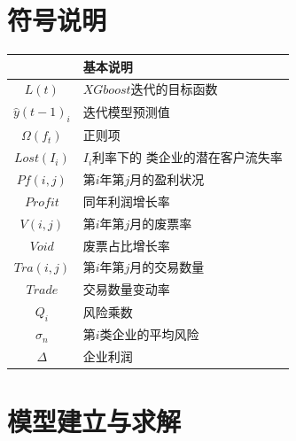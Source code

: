 \documentclass[UTF8]{ctexart}
\begin{document}
		\section{符号说明}
		\begin{table}[H]
			\begin{center}
				\begin{tabular}{c|l}
					\toprule[2pt]
					\rowcolor[gray]{0.8}
		
					\multicolumn{1}{m{8em}}{\centering 符号} & \multicolumn{1}{m{30em}}{\centering 基本说明}        \\
		
		
					\midrule[1.3pt]
					$L(t)$                                   & $XGboost$迭代的目标函数                        \\   
					$\hat{y}(t-1)_i$                         & 迭代模型预测值                      \\
					$\Omega (f_t)$                           & 正则项               \\
					$Lost(I_i)$                              & $I_i$利率下的 类企业的潜在客户流失率 \\
					$Pf(i,j)$                            	& 第$i$年第$j$月的盈利状况                 \\
					$Profit$                                 & 同年利润增长率       \\
					$V(i,j)$                                & 第$i$年第$j$月的废票率                 \\
					$Void$                                 & 废票占比增长率                     \\
					$Tra(i,j)$                                 & 第$i$年第$j$月的交易数量                \\
					$Trade$                                   & 交易数量变动率                 \\
					$Q_i$								&风险乘数 \\
					$\sigma _n$							&第$i$类企业的平均风险 \\
					$\Delta $								& 企业利润 \\                            
					\bottomrule[2pt]
				\end{tabular}
			\end{center}
		\end{table}
		
		
		
		\section{模型建立与求解}
\end{document}
